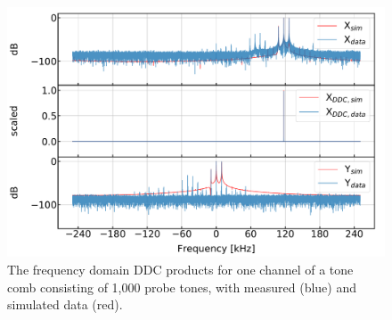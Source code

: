 \begin{figure}[!htbp]
\centering
\includegraphics[width=\textwidth]{figures/readout/sim/ddc_sim_100}
\caption[~An example of the frequency domain DDC products (measured and simulated) for one channel of a tone comb consisting of 1,000 tones.]{The frequency domain DDC products for one channel of a tone comb consisting of 1,000 probe tones, with measured (blue) and simulated data (red).}
\label{fig:ddc1000}
\end{figure}

